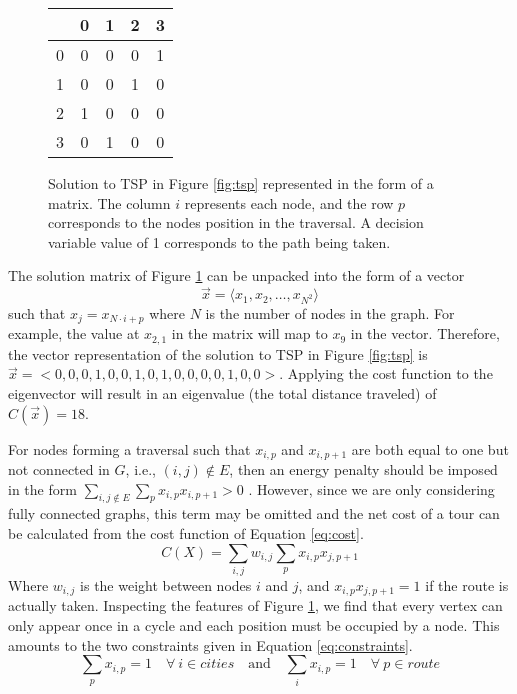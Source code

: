 \begin{figure}[h]
	\begin{center}
		\begin{tabular}{c|cccc}
			\backslashbox{i}{p}&0 &1 &2 &3 \\
			\hline
			0& 0&0&0&1\\
			
			1& 0&0&1&0\\
			
			2& 1&0&0&0\\
			
			3& 0&1&0&0\\
		\end{tabular}
	\end{center}\caption{\doublespacing Solution to TSP in Figure \ref{fig:tsp} represented in the form of a matrix. The column $i$ represents each node, and the row $p$ corresponds to the nodes position in the traversal. A decision variable value of 1 corresponds to the path being taken.}\label{fig:matrix}
\end{figure}
The solution matrix of Figure \ref{fig:matrix} can be unpacked into the form of a vector 
\begin{equation}
	\vec{x} = \langle x_1, x_2, \dots, x_{N^2} \rangle
	\label{eq:vector}
\end{equation}
such that $x_j = x_{N \cdot i+p}$ where $N$ is the number of nodes in the graph. 
For example, the value at $x_{2,1}$ in the matrix will map to $x_9$ in the vector. Therefore, the vector representation of the solution to TSP in Figure \ref{fig:tsp} is $\vec{x} = <0,0,0,1,0,0,1,0,1,0,0,0,0,1,0,0>$. 
Applying the cost function to the eigenvector will result in an eigenvalue (the total distance traveled) of $C(\vec{x}) = 18$.

For nodes forming a traversal such that $x_{i,p}$ and $x_{i,p+1}$ are both equal to one but not connected in $G$, i.e., $(i,j)\notin E$, then an energy penalty should be imposed in the form $\sum_{i,j \notin E}\sum_p x_{i,p}x_{i,p+1}>0$ \cite{lucas2014ising}.
However, since we are only considering fully connected graphs, this term may be omitted and the net cost of a tour can be calculated from the cost function of Equation \ref{eq:cost}.
\begin{equation}
	C(X)=\sum_{i,j}w_{i,j} \sum_p x_{i,p}x_{j,p+1} 
	\label{eq:cost}
\end{equation}
Where $w_{i,j}$ is the weight between nodes $i$ and $j$, and $x_{i,p}x_{j,p+1}=1$ if the route is actually taken. Inspecting the features of Figure \ref{fig:matrix}, we find that every vertex can only appear once in a cycle and each position must be occupied by a node. 
This amounts to the two constraints given in Equation \ref{eq:constraints}.
\begin{equation}
	\sum_p x_{i,p}=1 \quad \forall \: i \in cities \quad \text{and} \quad \sum_i x_{i,p}=1 \quad \forall \: p \in route
	\label{eq:constraints}
\end{equation}

